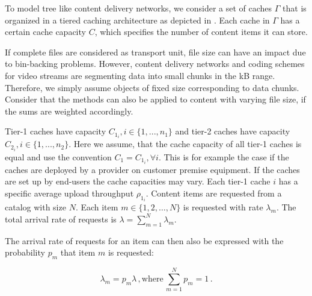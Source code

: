 To model tree like content delivery networks, we consider a set of caches $\Gamma$ that is organized in a tiered caching architecture as depicted in . Each cache in $\Gamma$ has a certain cache capacity $C$, which specifies the number of content items it can store.

If complete files are considered as transport unit, file size can have an impact due to bin-backing problems.
However, content delivery networks and coding schemes for video streams are segmenting data into small chunks in the kB range.
Therefore, we simply assume objects of fixed size corresponding to data chunks.
Consider that the methods can also be applied to content with varying file size, if the sums are weighted accordingly.

Tier-1 caches have capacity $C_{1_i}, i\in\{1,...,n_1\}$ and tier-2 caches have capacity $C_{2_i}, i\in\{1,...,n_2\}$.
Here we assume, that the cache capacity of all tier-1 caches is equal and use the convention $C_1=C_{1_i}, \forall i$.
This is for example the case if the caches are deployed by a provider on customer premise equipment.
If the caches are set up by end-users the cache capacities may vary.
Each tier-1 cache $i$ has a specific average upload throughput $\rho_{1_i}$.
Content items are requested from a catalog with size $N$.
Each item $m\in \{1,2,\dots,N\}$ is requested with rate $\lambda_m$.
The total arrival rate of requests is $\lambda=\sum_{m=1}^N \lambda_m$.

The arrival rate of requests for an item can then also be expressed with the probability $p_m$ that item $m$ is requested:

\begin{equation}
\lambda_m = p_m \lambda \, , \text{where} \, \sum_{m=1}^N p_m = 1 \, .
\end{equation}



